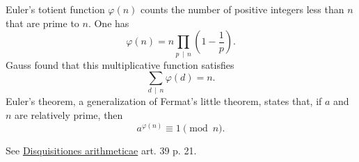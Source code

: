 \documentclass [preview, border = 20pt] {standalone}
\begin{document}
\pagecolor{black}
\color{white}
Euler's totient function $\varphi(n)$ counts the number of positive integers less than $n$ that are prime to $n$. One has
\[
\varphi(n) = n \prod_{p\,\mid\,n} \left( 1-\frac 1 p\right).
\]
Gauss found that this multiplicative function satisfies
\[
\sum_{d\,\mid\,n}\varphi(d) = n.
\]
Euler's theorem, a generalization of Fermat's little theorem, states that, if $a$ and $n$ are relatively prime, then
\[
a^{\varphi(n)} \equiv 1\pmod n.
\]

\footnotesize
See \ul{Disquisitiones arithmeticae} art. 39 p. 21.
\end{document}
